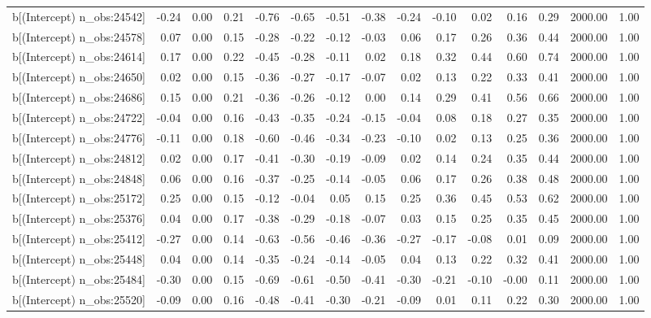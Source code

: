 \begin{table}[ht]
\begin{tabular}{rrrrrrrrrrrrrrr}
  b[(Intercept) n\_obs:24542] & -0.24 & 0.00 & 0.21 & -0.76 & -0.65 & -0.51 & -0.38 & -0.24 & -0.10 & 0.02 & 0.16 & 0.29 & 2000.00 & 1.00 \\ 
  b[(Intercept) n\_obs:24578] & 0.07 & 0.00 & 0.15 & -0.28 & -0.22 & -0.12 & -0.03 & 0.06 & 0.17 & 0.26 & 0.36 & 0.44 & 2000.00 & 1.00 \\ 
  b[(Intercept) n\_obs:24614] & 0.17 & 0.00 & 0.22 & -0.45 & -0.28 & -0.11 & 0.02 & 0.18 & 0.32 & 0.44 & 0.60 & 0.74 & 2000.00 & 1.00 \\ 
  b[(Intercept) n\_obs:24650] & 0.02 & 0.00 & 0.15 & -0.36 & -0.27 & -0.17 & -0.07 & 0.02 & 0.13 & 0.22 & 0.33 & 0.41 & 2000.00 & 1.00 \\ 
  b[(Intercept) n\_obs:24686] & 0.15 & 0.00 & 0.21 & -0.36 & -0.26 & -0.12 & 0.00 & 0.14 & 0.29 & 0.41 & 0.56 & 0.66 & 2000.00 & 1.00 \\ 
  b[(Intercept) n\_obs:24722] & -0.04 & 0.00 & 0.16 & -0.43 & -0.35 & -0.24 & -0.15 & -0.04 & 0.08 & 0.18 & 0.27 & 0.35 & 2000.00 & 1.00 \\ 
  b[(Intercept) n\_obs:24776] & -0.11 & 0.00 & 0.18 & -0.60 & -0.46 & -0.34 & -0.23 & -0.10 & 0.02 & 0.13 & 0.25 & 0.36 & 2000.00 & 1.00 \\ 
  b[(Intercept) n\_obs:24812] & 0.02 & 0.00 & 0.17 & -0.41 & -0.30 & -0.19 & -0.09 & 0.02 & 0.14 & 0.24 & 0.35 & 0.44 & 2000.00 & 1.00 \\ 
  b[(Intercept) n\_obs:24848] & 0.06 & 0.00 & 0.16 & -0.37 & -0.25 & -0.14 & -0.05 & 0.06 & 0.17 & 0.26 & 0.38 & 0.48 & 2000.00 & 1.00 \\ 
  b[(Intercept) n\_obs:25172] & 0.25 & 0.00 & 0.15 & -0.12 & -0.04 & 0.05 & 0.15 & 0.25 & 0.36 & 0.45 & 0.53 & 0.62 & 2000.00 & 1.00 \\ 
  b[(Intercept) n\_obs:25376] & 0.04 & 0.00 & 0.17 & -0.38 & -0.29 & -0.18 & -0.07 & 0.03 & 0.15 & 0.25 & 0.35 & 0.45 & 2000.00 & 1.00 \\ 
  b[(Intercept) n\_obs:25412] & -0.27 & 0.00 & 0.14 & -0.63 & -0.56 & -0.46 & -0.36 & -0.27 & -0.17 & -0.08 & 0.01 & 0.09 & 2000.00 & 1.00 \\ 
  b[(Intercept) n\_obs:25448] & 0.04 & 0.00 & 0.14 & -0.35 & -0.24 & -0.14 & -0.05 & 0.04 & 0.13 & 0.22 & 0.32 & 0.41 & 2000.00 & 1.00 \\ 
  b[(Intercept) n\_obs:25484] & -0.30 & 0.00 & 0.15 & -0.69 & -0.61 & -0.50 & -0.41 & -0.30 & -0.21 & -0.10 & -0.00 & 0.11 & 2000.00 & 1.00 \\ 
  b[(Intercept) n\_obs:25520] & -0.09 & 0.00 & 0.16 & -0.48 & -0.41 & -0.30 & -0.21 & -0.09 & 0.01 & 0.11 & 0.22 & 0.30 & 2000.00 & 1.00 \\ 

\end{tabular}
\end{table}
